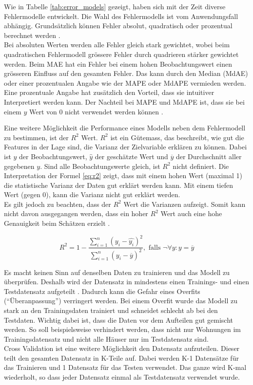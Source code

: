 Wie in Tabelle \ref{tab:error_models} gezeigt, haben sich mit der Zeit diverse Fehlermodelle entwickelt. Die Wahl des Fehlermodells ist vom Anwendungsfall abhängig. Grundsätzlich können Fehler absolut, quadratisch oder prozentual berechnet werden \cite{error_models}.\\
Bei absoluten Werten werden alle Fehler gleich stark gewichtet, wobei beim quadratischen Fehlermodell grössere Fehler durch quadrieren stärker gewichtet werden. Beim MAE hat ein Fehler bei einem hohen Beobachtungswert einen grösseren Einfluss auf den gesamten Fehler. Das kann durch den Median (MdAE) oder einer prozentualen Angabe wie der MAPE oder MdAPE vermieden werden. Eine prozentuale Angabe hat zusätzlich den Vorteil, dass sie intuitiver Interpretiert werden kann. Der Nachteil bei MAPE und MdAPE ist, dass sie bei einem $y$ Wert von 0 nicht verwendet werden können \cite{error_models_2}.

Eine weitere Möglichkeit die Performance eines Modells neben dem Fehlermodell zu bestimmen, ist der $R^2$ Wert. $R^2$ ist ein Gütemass, das beschreibt, wie gut die Features in der Lage sind, die Varianz der Zielvariable erklären zu können. Dabei ist $y$ der Beobachtungswert, $\hat{y}$ der geschätzte Wert und $\overline{y}$ der Durchschnitt aller gegebenen $y$. Sind alle Beobachtungswerte gleich, ist $R^2$ nicht definiert. Die Interpretation der Formel \eqref{eq:r2} zeigt, dass mit einem hohen Wert (maximal 1) die statistische Varianz der Daten gut erklärt werden kann. Mit einem tiefen Wert (gegen 0), kann die Varianz nicht gut erklärt werden. \\
Es gilt jedoch zu beachten, dass der $R^2$ Wert die Varianzen aufzeigt. Somit kann nicht davon ausgegangen werden, dass ein hoher $R^2$ Wert auch eine hohe Genauigkeit beim Schätzen erzielt \cite{r2, r2_2}.

\begin{equation}
\label{eq:r2}
R^2 = 1 - \frac{\sum_{i=1}^{n} (y_i - \hat{y_i})^2}{\sum_{i=1}^{n}(y_i - \overline{y})^2},\text{ falls } \neg \forall y:y = \overline{y}
\end{equation}

Es macht keinen Sinn auf denselben Daten zu trainieren und das Modell zu überprüfen. Deshalb wird der Datensatz in mindestens einen Trainings- und einen Testdatensatz aufgeteilt \cite{cross_validation}.
Dadurch kann die Gefahr eines Overfits (“Überanpassung”) verringert werden. Bei einem Overfit wurde das Modell zu stark an den Trainingsdaten trainiert und schneidet schlecht ab bei den Testdaten. Wichtig dabei ist, dass die Daten vor dem Aufteilen gut gemischt werden. So soll beispielsweise verhindert werden, dass nicht nur Wohnungen im Trainingsdatensatz und nicht alle Häuser nur im Testdatensatz sind.\\
Cross Validation ist eine weitere Möglichkeit den Datensatz aufzuteilen. Dieser teilt den gesamten Datensatz in K-Teile auf. Dabei werden K-1 Datensätze für das Trainieren und 1 Datensatz für das Testen verwendet. Das ganze wird K-mal wiederholt, so dass jeder Datensatz einmal als Testdatensatz verwendet wurde.
%
